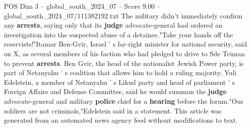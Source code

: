 \begin{textsample}{POS Dim 3 – global\_south\_2024\_07 – Score 9.00 – global\_south\_2024\_07/111382192.txt}
The military didn't immediately confirm any \textbf{arrests}, saying only that its \textbf{judge} advocate-general had ordered an investigation into the suspected abuse of a detainee."Take your hands off the reservists!"Itamar Ben-Gvir, Israel ' s far-right minister for national security, said on X, as several members of his faction who had pledged to drive to Sde Teiman to prevent \textbf{arrests}.
Ben Gvir, the head of the nationalist Jewish Power party, is part of Netanyahu ' s coalition that allows him to hold a ruling majority.
Yuli Edelstein, a member of Netanyahu ' s Likud party and head of parliament ' s Foreign Affairs and Defense Committee, said he would summon the \textbf{judge} advocate-general and military \textbf{police} chief for a \textbf{hearing} before the forum."Our soldiers are not criminals,"Edelstein said in a statement.
This article was generated from an automated news agency feed without modifications to text.

\end{textsample}
